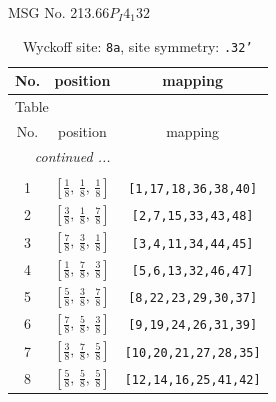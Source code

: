 \documentclass[fleqn,8pt]{jsarticle}
\begin{document}
\setcounter{MaxMatrixCols}{32}

\renewcommand{\tablename}{Table~}
\renewcommand{\figurename}{Figure~}
\begin{center}
\LARGE
MSG No. 213.66\quad$P_{I}4_{1}32$
\end{center}
\renewcommand{\arraystretch}{1.2}
\begin{longtable}{ccc}
\caption{Wyckoff site: {\tt 8a}, site symmetry: {\tt .32'}}
 \\
 \hline \hline
No. & position & mapping \\ \hline \endfirsthead

\multicolumn{2}{l}{\tablename\ \thetable{}} \\
 \hline \hline
No. & position & mapping \\ \hline \endhead

 \hline \hline
\multicolumn{2}{r}{\footnotesize\it continued ...} \\ \endfoot

 \hline \hline
\multicolumn{2}{r}{} \\ \endlastfoot

1 & $\left[ \frac{1}{8},\, \frac{1}{8},\, \frac{1}{8} \right]$ & {\tt [1,17,18,36,38,40]} \\ \hline
2 & $\left[ \frac{3}{8},\, \frac{1}{8},\, \frac{7}{8} \right]$ & {\tt [2,7,15,33,43,48]} \\ \hline
3 & $\left[ \frac{7}{8},\, \frac{3}{8},\, \frac{1}{8} \right]$ & {\tt [3,4,11,34,44,45]} \\ \hline
4 & $\left[ \frac{1}{8},\, \frac{7}{8},\, \frac{3}{8} \right]$ & {\tt [5,6,13,32,46,47]} \\ \hline
5 & $\left[ \frac{5}{8},\, \frac{3}{8},\, \frac{7}{8} \right]$ & {\tt [8,22,23,29,30,37]} \\ \hline
6 & $\left[ \frac{7}{8},\, \frac{5}{8},\, \frac{3}{8} \right]$ & {\tt [9,19,24,26,31,39]} \\ \hline
7 & $\left[ \frac{3}{8},\, \frac{7}{8},\, \frac{5}{8} \right]$ & {\tt [10,20,21,27,28,35]} \\ \hline
8 & $\left[ \frac{5}{8},\, \frac{5}{8},\, \frac{5}{8} \right]$ & {\tt [12,14,16,25,41,42]} \\
\end{longtable}
\renewcommand{\arraystretch}{1.2}
\end{document}
